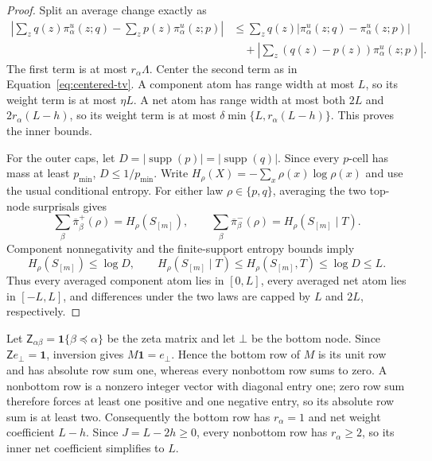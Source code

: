 \documentclass[11pt]{article}
\theoremstyle{definition}
\newcommand{\Ind}{\mathbf{1}}
\newcommand{\supp}{\operatorname{supp}}
\begin{document}
\begin{proof}
	Split an average change exactly as
	\begin{align}
	  \left|
	    \sum_z q(z)\pi_\alpha^u(z;q)
	    -
	    \sum_z p(z)\pi_\alpha^u(z;p)
	  \right|
	  &\le
	  \sum_z q(z)
	    |\pi_\alpha^u(z;q)-\pi_\alpha^u(z;p)|\\
	  &\quad+
	  \left|
	    \sum_z(q(z)-p(z))\pi_\alpha^u(z;p)
	  \right|.
	\end{align}
The first term is at most $r_\alpha\Lambda$.  Center the second term as in
Equation~\eqref{eq:centered-tv}.  A component atom has range width at most $L$, so its weight term
is at most $\eta L$.  A net atom has range width at most both $2L$ and
$2r_\alpha(L-h)$, so its weight term is at most
$\delta\min\{L,r_\alpha(L-h)\}$.  This proves the inner bounds.

For the outer caps, let $D=|\supp(p)|=|\supp(q)|$.  Since every $p$-cell has mass at least
$p_{\min}$, $D\le1/p_{\min}$.  Write
$H_\rho(X)=-\sum_x\rho(x)\log\rho(x)$ and use the usual conditional entropy.  For either law
$\rho\in\{p,q\}$, averaging the two top-node surprisals gives
\[
  \sum_\beta\overline{\pi}_\beta^+(\rho)
    =H_\rho(S_{[m]}),
  \qquad
  \sum_\beta\overline{\pi}_\beta^-(\rho)
    =H_\rho(S_{[m]}\mid T).
\]
Component nonnegativity and the finite-support entropy bounds imply
\[
  H_\rho(S_{[m]})\le\log D,
  \qquad
  H_\rho(S_{[m]}\mid T)
    \le H_\rho(S_{[m]},T)\le\log D\le L.
\]
Thus every averaged component atom lies in $[0,L]$, every averaged net atom lies in $[-L,L]$,
and differences under the two laws are capped by $L$ and $2L$, respectively.
\end{proof}

Let $\mathsf Z_{\alpha\beta}=\Ind\{\beta\preceq\alpha\}$ be the zeta matrix and let $\bot$ be the
bottom node.  Since $\mathsf Z e_\bot=\mathbf 1$, inversion gives $M\mathbf 1=e_\bot$.  Hence the
bottom row of $M$ is its unit row and has absolute row sum one, whereas every nonbottom row sums to
zero.  A nonbottom row is a nonzero integer vector with diagonal entry one; zero row sum therefore
forces at least one positive and one negative entry, so its absolute row sum is at least two.
Consequently the bottom row has $r_\alpha=1$ and net weight coefficient $L-h$.  Since
$J=L-2h\ge0$, every nonbottom row has $r_\alpha\ge2$, so its inner net coefficient simplifies to
$L$.
\end{document}
